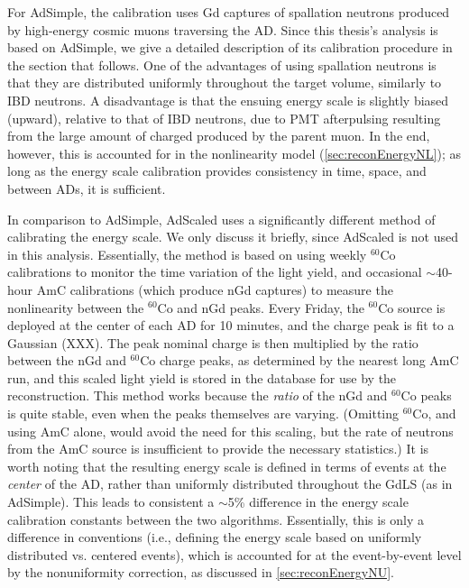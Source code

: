 \documentclass[../thesis.tex]{subfiles}
\begin{document}
For AdSimple, the calibration uses Gd captures of spallation neutrons produced
by high-energy cosmic muons traversing the AD. Since this thesis's analysis is
based on AdSimple, we give a detailed description of its calibration procedure
in the section that follows. One of the advantages of using spallation neutrons
is that they are distributed uniformly throughout the target volume, similarly
to IBD neutrons. A disadvantage is that the ensuing energy scale is slightly
biased (upward), relative to that of IBD neutrons, due to PMT afterpulsing
resulting from the large amount of charged produced by the parent muon. In the
end, however, this is accounted for in the nonlinearity model
(\autoref{sec:reconEnergyNL}); as long as the energy scale calibration provides
consistency in time, space, and between ADs, it is sufficient.

In comparison to AdSimple, AdScaled uses a significantly different method of
calibrating the energy scale. We only discuss it briefly, since AdScaled is not
used in this analysis. Essentially, the method is based on using weekly
$^{60}$Co calibrations to monitor the time variation of the light yield, and
occasional $\sim$40-hour AmC calibrations (which produce nGd captures) to
measure the nonlinearity between the $^{60}$Co and nGd peaks. Every Friday, the
$^{60}$Co source is deployed at the center of each AD for 10 minutes, and the
charge peak is fit to a Gaussian (XXX). The peak nominal charge is then
multiplied by the ratio between the nGd and $^{60}$Co charge peaks, as
determined by the nearest long AmC run, and this scaled light yield is stored in
the database for use by the reconstruction. This method works because the
\emph{ratio} of the nGd and $^{60}$Co peaks is quite stable, even when the peaks
themselves are varying. (Omitting $^{60}$Co, and using AmC alone, would avoid
the need for this scaling, but the rate of neutrons from the AmC source is
insufficient to provide the necessary statistics.) It is worth noting that the
resulting energy scale is defined in terms of events at the \emph{center} of the
AD, rather than uniformly distributed throughout the GdLS (as in AdSimple). This
leads to consistent a $\sim$5\% difference in the energy scale calibration
constants between the two algorithms. Essentially, this is only a difference in
conventions (i.e., defining the energy scale based on uniformly distributed
vs. centered events), which is accounted for at the event-by-event level by the
nonuniformity correction, as discussed in \autoref{sec:reconEnergyNU}.
\end{document}
